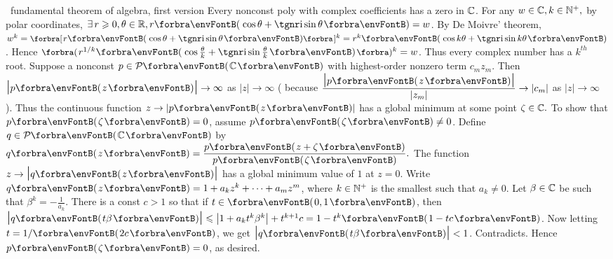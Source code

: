 \documentclass[a4paper, 11pt, UTF8]{article}
\begin{document}
\begin{large}
\BulletPoint \,\hspace{1pt}\NoteFor{[4.13]} {\tgsl fundamental theorem of algebra, first version}\TextB{}
{\tgsl Every nonconst poly with complex coefficients has a zero in ${\mathbb{C}}$.} 
For any $w\in{\mathbb{C}},k\in{\mathbb{N}^+},$ by polar coordinates, $\exists\,r\geqslant 0,\theta\in\Rbb,r\Par{\cos\theta + \i \sin\theta} = w$.\TextB{}
By De Moivre' theorem, $w^k=\Sbra{r\Par{\cos\theta +\i\sin \theta}}{^k}=r^k\Par{\cos k\theta + \i \sin k\theta}$.\TextB{}
Hence $\BigPar{r^{1/k}\Par{\cos\frac{\theta}{k} +\i\sin\frac{\theta}{k}}}{^k}=w$. Thus every complex number has a {\tgsl $k^{th}$ root}.\vspace{5pt}\TextB{}
Suppose a nonconst $p\in\PoC{}$ with highest-order nonzero term $c_m z_m$.\TextB{}
Then $\Mid{p\Par{z}}\rightarrow\infty$ as $\left|z\right|\rightarrow\infty$ ( because $\displaystyle\frac{\Mid{p\Par{z}}}{\left|z_m\right|}\rightarrow\left|c_m\right|$ as $\left|z\right|\rightarrow\infty$ ).\TextB{}
\vspace{3pt}Thus the continuous function $z\rightarrow\left|p\Par{z}\right|$ has a global minimum at some point $\zeta\in{\mathbb{C}}.$\TextB{}
\vspace{3pt}To show that $p\Par{\zeta} = 0$, assume $p\Par{\zeta}\neq 0$. Define $q\in\PoC{}$ by $q\Par{z}=\displaystyle\frac{p\Par{z+\zeta}}{p\Par{\zeta}}.$\TextB{}
The function $z\rightarrow\Mid{q\Par{z}}$ has a global minimum value of $1$ at $z = 0$.\TextB{}
Write $q\Par{z} = 1 + a_k z^k + \dots + a_m z^m$, where $k\in{\mathbb{N}^+}$ is the smallest such that $a_k\neq 0$.\TextB{}
Let $\beta\in{\mathbb{C}}$ be such that $\displaystyle\beta^k=-\frac{1}{a_k}$.\TextB{}
There is a const $c > 1$ so that if
$t\in \Par{0, 1}$, then $\Mid{q\Par{t\beta}}\leqslant\left|1 + a_k t^k\beta^k\right|+t^{k+1}c = 1 - t^k \Par{1 - tc}$.\TextB{}
Now letting $t=1/\Par{2c}$, we get $\Mid{q\Par{t\beta}}<1$. Contradicts. Hence $p\Par{\zeta} = 0$, as desired.\PfEnd
\SepLine


\end{large}
\end{document}
